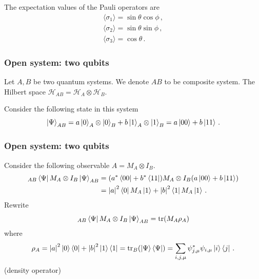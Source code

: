 \documentclass[12pt, aspectratio=169]{beamer}
\begin{document}
\begin{frame}
    \begin{theorem}
        The expectation values of the Pauli operators are
        \begin{gather*}
            \langle \sigma_1 \rangle = \sin \theta \cos \phi \,,  \\
            \langle \sigma_2 \rangle = \sin \theta \sin \phi \,, \\
            \langle \sigma_3 \rangle = \cos \theta \,.
        \end{gather*}
    \end{theorem}

\end{frame}

\begin{frame}
    \frametitle{Open system: two qubits}
    Let $A, B$ be two quantum systems. We denote $AB$ to be composite system.
    The Hilbert space $\mathcal{H}_{AB} = \mathcal{H}_A \otimes \mathcal{H}_B$.

    Consider the following state in this system
    \begin{equation*}
        \ket{\Psi}_{AB} = a \ket{0}_A \otimes \ket{0}_B +
                            b \ket{1}_A \otimes \ket{1}_B
                            = a \ket{00} + b\ket{11} \,.
    \end{equation*}
\end{frame}

\begin{frame}
    \frametitle{Open system: two qubits}
    Consider the following observable $A = M_A \otimes I_B$.
    \begin{align*}
        _{AB} \bra{\Psi} M_A \otimes I_B \ket{\Psi}_{AB} 
        &=
        (a^* \bra{00} + b^*\bra{11}) M_A \otimes I_B (a\ket{00} + b\ket{11})\\
        &= \abs{a}^2 \bra{0}M_A \ket{1} + \abs{b}^2 \bra{1} M_A \ket{1} \,.
    \end{align*}
    Rewrite
    \begin{equation*}
        _{AB} \bra{\Psi} M_A \otimes I_B \ket{\Psi}_{AB} 
        =
        \tr(M_A \rho_A)
    \end{equation*}
    where 
    \begin{equation*}
        \rho_A = \abs{a}^2 \ket{0}\bra{0} + \abs{b}^2 \ket{1}\bra{1} 
        = \tr_B( \ket{\Psi} \bra{\Psi})
        = \sum_{i,j,\mu} \psi^*_{j,\mu} \psi_{i,\mu} \ket{i}\bra{j} \,.
    \end{equation*}
    (density operator)
\end{frame}
\end{document}
